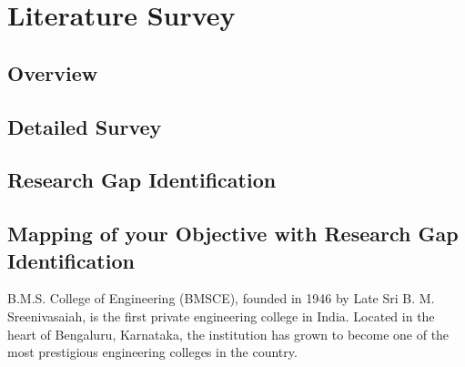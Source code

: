 \chapter{Literature Survey}
\section{Overview}
\section{Detailed Survey}
\section{Research Gap Identification}
\section{Mapping of your Objective with Research Gap Identification}

B.M.S. College of Engineering (BMSCE), founded in 1946 by Late Sri B. M. Sreenivasaiah, 
is the first private engineering college in India. Located in the heart of Bengaluru, 
Karnataka, the institution has grown to become one of the most prestigious engineering 
colleges in the country. 
